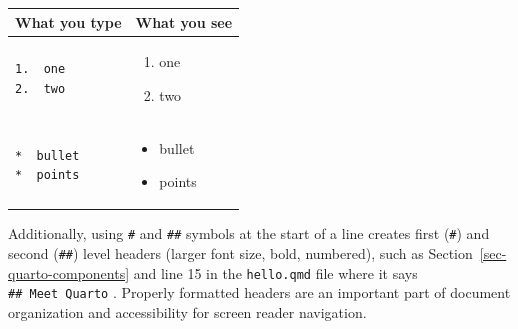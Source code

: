 \documentclass[
  letterpaper,
  DIV=11,
  numbers=noendperiod,
  oneside]{scrreprt}
\providecommand{\tightlist}{%
  \setlength{\itemsep}{0pt}\setlength{\parskip}{0pt}}\usepackage{longtable,booktabs,array}
\begin{document}
\begin{longtable}[]{@{}
  >{\centering\arraybackslash}p{}
  >{\centering\arraybackslash}p{}@{}}
\toprule\noalign{}
\begin{minipage}[b]{\linewidth}\centering
What you type
\end{minipage} & \begin{minipage}[b]{\linewidth}\centering
What you see
\end{minipage} \\
\midrule\noalign{}
\endhead
\bottomrule\noalign{}
\endlastfoot
\begin{minipage}[t]{\linewidth}\centering
\begin{verbatim}
1.  one
2.  two
\end{verbatim}
\end{minipage} & \begin{minipage}[t]{\linewidth}\centering
\begin{enumerate}
\def\labelenumi{\arabic{enumi}.}
\tightlist
\item
  one
\item
  two
\end{enumerate}
\end{minipage} \\
\begin{minipage}[t]{\linewidth}\centering
\begin{verbatim}
*  bullet
*  points
\end{verbatim}
\end{minipage} & \begin{minipage}[t]{\linewidth}\centering
\begin{itemize}
\tightlist
\item
  bullet
\item
  points
\end{itemize}
\end{minipage} \\
\end{longtable}

Additionally, using \texttt{\#} and \texttt{\#\#} symbols at the start
of a line creates first (\texttt{\#}) and second (\texttt{\#\#}) level
headers (larger font size, bold, numbered), such as
Section~\ref{sec-quarto-components} and line 15 in the
\texttt{hello.qmd} file where it says \texttt{\#\#\ Meet\ Quarto} .
Properly formatted headers are an important part of document
organization and accessibility for screen reader navigation.
\end{document}

